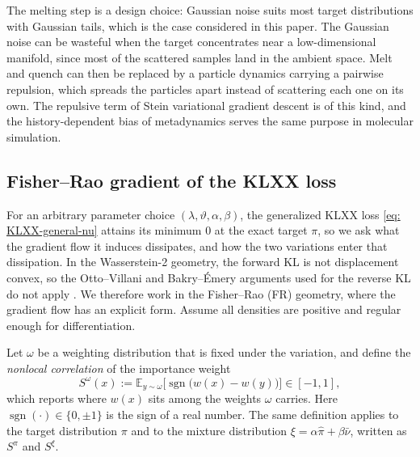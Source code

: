 \documentclass{article}
\begin{document}
\begin{remark}
	The melting step is a design choice: Gaussian noise suits most target distributions with Gaussian tails, which is the case considered in this paper. The Gaussian noise can be wasteful when the target concentrates near a low-dimensional manifold, since most of the scattered samples land in the ambient space. Melt and quench can then be replaced by a particle dynamics carrying a pairwise repulsion, which spreads the particles apart instead of scattering each one on its own. The repulsive term of Stein variational gradient descent \citep{liu2016stein} is of this kind, and the history-dependent bias of metadynamics \citep{laio2002escaping} serves the same purpose in molecular simulation.
\end{remark}

\subsection{{\color{blue}Fisher--Rao gradient of the KLXX loss}}
\label{subsec: FR-convergence}

For an arbitrary parameter choice $(\lambda,\vartheta,\alpha,\beta)$, the generalized KLXX loss \eqref{eq: KLXX-general-nu} attains its minimum $0$ at the exact target $\pi$, {\color{blue}so we ask what the gradient flow it induces dissipates, and how the two variations enter that dissipation.}
In the Wasserstein-2 geometry, the forward KL is not displacement convex, so the Otto--Villani and Bakry--{\'E}mery arguments used for the reverse KL do not apply \citep{otto2000generalization,bakry2014analysis}. We therefore work in the Fisher--Rao (FR) geometry, where the gradient flow has an explicit form. Assume all densities are positive and regular enough for differentiation.

Let $\omega$ be a weighting distribution that is fixed under the variation, and define the \emph{nonlocal correlation} of the importance weight
\begin{equation}
	S^{\omega}(x) := \mathbb E_{y\sim\omega}\bigl[\operatorname{sgn}\bigl(w(x)-w(y)\bigr)\bigr] \in [-1,1],
	\label{eq: FR-S}
\end{equation}
which reports where $w(x)$ sits among the weights $\omega$ carries. Here $\operatorname{sgn}(\cdot)\in\{0,\pm1\}$ is the sign of a real number.
The same definition applies to the target distribution $\pi$ and to the mixture distribution $\xi=\alpha\hat\pi+\beta\bar\nu$, written as $S^{\pi}$ and $S^{\xi}$.
\end{document}

